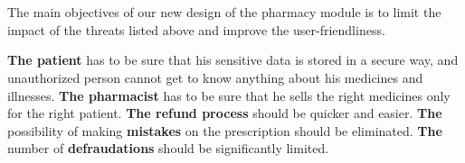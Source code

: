 \chapter{   }

The main objectives of our new design of the pharmacy module is to limit the impact of the threats listed above and improve the user-friendliness. 

	\textbf{ The patient} has to be sure that his sensitive data is stored in a secure way, and unauthorized person cannot get to know anything about his medicines and illnesses. \textbf{The pharmacist} has to be sure that he sells the right medicines only for the right patient. \textbf{The refund process} should be quicker and easier. \textbf{The} possibility of making \textbf{mistakes} on the prescription should be eliminated. \textbf{The} number of \textbf{defraudations} should be significantly limited.





